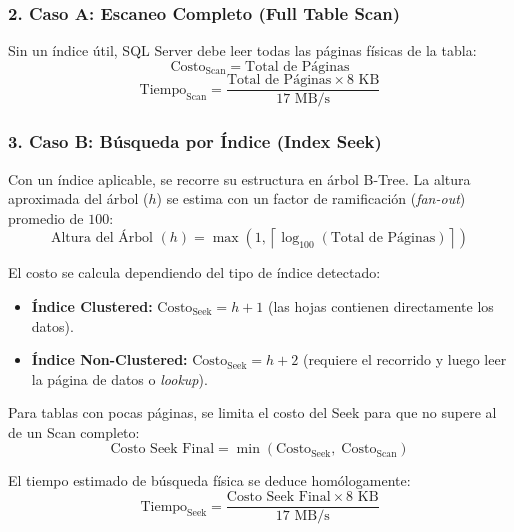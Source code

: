 \documentclass[11pt,a4paper]{article}
\begin{document}
\subsubsection{2. Caso A: Escaneo Completo (Full Table Scan)}
Sin un índice útil, SQL Server debe leer todas las páginas físicas de la tabla:
\begin{equation}
    \text{Costo}_{\text{Scan}} = \text{Total de Páginas}
\end{equation}
\begin{equation}
    \text{Tiempo}_{\text{Scan}} = \frac{\text{Total de Páginas} \times 8\text{ KB}}{17\text{ MB/s}}
\end{equation}

\subsubsection{3. Caso B: Búsqueda por Índice (Index Seek)}
Con un índice aplicable, se recorre su estructura en árbol B-Tree. La altura aproximada del árbol ($h$) se estima con un factor de ramificación (\textit{fan-out}) promedio de $100$:
\begin{equation}
    \text{Altura del Árbol } (h) = \max\left(1, \left\lceil \log_{100}(\text{Total de Páginas}) \right\rceil\right)
\end{equation}

El costo se calcula dependiendo del tipo de índice detectado:
\begin{itemize}
    \item \textbf{Índice Clustered:} $\text{Costo}_{\text{Seek}} = h + 1$ (las hojas contienen directamente los datos).
    \item \textbf{Índice Non-Clustered:} $\text{Costo}_{\text{Seek}} = h + 2$ (requiere el recorrido y luego leer la página de datos o \textit{lookup}).
\end{itemize}

Para tablas con pocas páginas, se limita el costo del Seek para que no supere al de un Scan completo:
\begin{equation}
    \text{Costo Seek Final} = \min(\text{Costo}_{\text{Seek}},\; \text{Costo}_{\text{Scan}})
\end{equation}

El tiempo estimado de búsqueda física se deduce homólogamente:
\begin{equation}
    \text{Tiempo}_{\text{Seek}} = \frac{\text{Costo Seek Final} \times 8\text{ KB}}{17\text{ MB/s}}
\end{equation}
\end{document}
